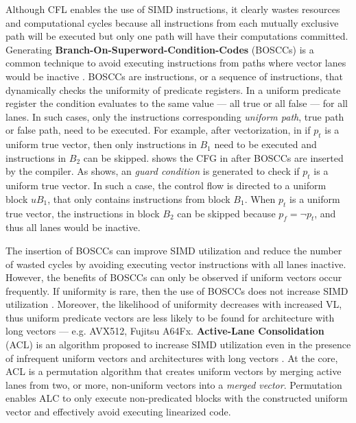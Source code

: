 Although CFL enables the use of SIMD instructions, it clearly wastes resources and computational cycles because all instructions from each mutually exclusive path will be executed but only one path will have their computations committed.
Generating \textbf{Branch-On-Superword-Condition-Codes} (BOSCCs) is a common technique to avoid executing instructions from paths where vector lanes would be inactive \cite{ jaewook_shin_superword-level_2005, shin_introducing_2007, shin_evaluating_2009}.
BOSCCs are instructions, or a sequence of instructions, that dynamically checks the uniformity of predicate registers.
In a uniform predicate register the condition evaluates to the same value --- all true or all false --- for all lanes.
In such cases, only the instructions corresponding \emph{uniform path}, true path or false path, need to be executed.
For example, after vectorization, in  if $p_t$ is a uniform true vector, then only instructions in $B_1$ need to be executed and instructions in $B_2$ can be skipped.
 shows the CFG in  after BOSCCs are inserted by the compiler.
As  shows, an  \emph{guard condition} is generated to check if $p_t$ is a uniform true vector.
In such a case, the control flow is directed to a uniform block $uB_1$, that only contains instructions from block $B_1$.
When $p_t$ is a uniform true vector, the instructions in block $B_2$ can be skipped because $p_f = \neg p_t$, and thus all lanes would be inactive.

The insertion of BOSCCs can improve SIMD utilization and reduce the number of wasted cycles by avoiding executing vector instructions with all lanes inactive.
However, the benefits of BOSCCs can only be observed if uniform vectors occur frequently.
If uniformity is rare, then the use of BOSCCs does not increase SIMD utilization \cite{praharenka_vectorizing_2022}.
Moreover, the likelihood of uniformity decreases with increased VL, thus uniform predicate vectors are less likely to be found for architecture with long vectors --- e.g. AVX512, Fujitsu A64Fx.
\textbf{Active-Lane Consolidation} (ACL) is an algorithm proposed to increase SIMD utilization even in the presence of infrequent uniform vectors and architectures with long vectors \cite{praharenka_vectorizing_2022}.
At the core, ACL is a permutation algorithm that creates uniform vectors by merging active lanes from two, or more, non-uniform vectors into a \emph{merged vector}.
Permutation enables ALC to only execute non-predicated blocks with the constructed uniform vector and effectively avoid executing linearized code.

